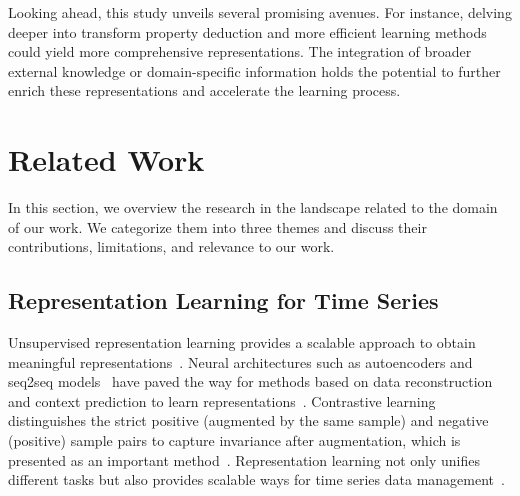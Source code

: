 \documentclass{article}
\begin{document}
Looking ahead, this study unveils several promising avenues. For instance, delving deeper into transform property deduction and more efficient learning methods could yield more comprehensive representations. The integration of broader external knowledge or domain-specific information holds the potential to further enrich these representations and accelerate the learning process.







\newpage
\appendix
\onecolumn

\section{Related Work}\label{sec:rela}

In this section, we overview the research in the landscape related to the domain of our work. We categorize them into three themes and discuss their contributions, limitations, and relevance to our work.

\subsection{Representation Learning for Time Series}

Unsupervised representation learning provides a scalable approach to obtain meaningful representations~\cite{meng2023unsupervised}. Neural architectures such as autoencoders and seq2seq models~\cite{vadiraja2020survey} have paved the way for methods based on data reconstruction and context prediction to learn representations~\cite{ma2019learning, malhotra2017timenet}. Contrastive learning distinguishes the strict positive (augmented by the same sample) and negative (positive) sample pairs to capture invariance after augmentation, which is presented as an important method~\cite{huynh2022boosting,franceschi2019unsupervised, eldele2021time, yue2022ts2vec, wu2022timesnet}. Representation learning not only unifies different tasks but also provides scalable ways for time series data management~\cite{paparrizos2019grail}.
\end{document}
